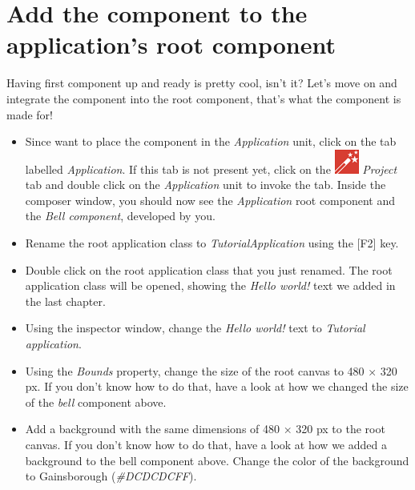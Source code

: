 \documentclass[
  a4paper,
,tablecaptionabove
]{scrbook}
\begin{document}
\hypertarget{_add_the_component_to_the_applications_root_component}{%
\section{Add the component to the application's root
component}\label{_add_the_component_to_the_applications_root_component}}

Having first component up and ready is pretty cool, isn't it? Let's move
on and integrate the component into the root component, that's what the
component is made for!

\begin{itemize}
\item
  Since want to place the component in the \emph{Application} unit,
  click on the tab labelled \emph{Application}. If this tab is not
  present yet, click on the
  \includegraphics{./../asciidoc/modules/ROOT/assets/images/icons/EmbeddedWizardIcon.png}
  \emph{Project} tab and double click on the \emph{Application} unit to
  invoke the tab. Inside the composer window, you should now see the
  \emph{Application} root component and the \emph{Bell component},
  developed by you.
\item
  Rename the root application class to \emph{TutorialApplication} using
  the {[}F2{]} key.
\item
  Double click on the root application class that you just renamed. The
  root application class will be opened, showing the \emph{Hello world!}
  text we added in the last chapter.
\item
  Using the inspector window, change the \emph{Hello world!} text to
  \emph{Tutorial application}.
\item
  Using the \emph{Bounds} property, change the size of the root canvas
  to 480 × 320 px. If you don't know how to do that, have a look at how
  we changed the size of the \emph{bell} component above.
\item
  Add a background with the same dimensions of 480 × 320 px to the root
  canvas. If you don't know how to do that, have a look at how we added
  a background to the bell component above. Change the color of the
  background to Gainsborough (\emph{\#DCDCDCFF}).
\end{itemize}
\end{document}
